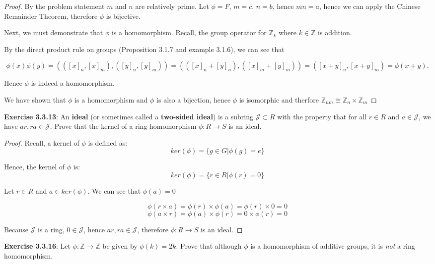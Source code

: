 \documentclass[a4paper]{article}
\begin{document}
\begin{myparindent}{0pt}
\begin{proof}
  By the problem statement $m$ and $n$ are relatively prime. Let $\phi = F$, $m = c$, $n = b$,
  hence $mn = a$, hence we can apply the Chinese Remainder Theorem, therefore $\phi$
  is bijective. \newline

  Next, we must demonstrate that $\phi$ is a homomorphism. Recall, the group
  operator for $\mathbb{Z}_k$ where $k \in \mathbb{Z}$ is addition. \newline

  By the direct product rule on groups (Proposition 3.1.7 and example 3.1.6), we
  can see that

  \[ \phi(x) \phi(y) = (([x]_n, [x]_m), ([y]_n, [y]_m)) = (([x]_n + [y]_n), ([x]_m + [y]_m)) = ([x + y]_n, [x + y]_m) = \phi(x + y). \]

  Hence $\phi$ is indeed a homomorphism. \newline

  We have shown that $\phi$ is a homomorphism and $\phi$ is also a bijection,
  hence $\phi$ is isomorphic and therfore $\mathbb{Z}_{nm} \cong \mathbb{Z}_n \times \mathbb{Z}_m$
\end{proof}

\textbf{Exercise 3.3.13}:
An \textbf{ideal} (or sometimes called a \textbf{two-sided ideal}) is a
subring $\mathcal{J} \subset R$ with the property that for all
$r \in R$ and $a \in \mathcal{J}$, we have $ar, ra \in \mathcal{J}$.
Prove that the kernel of a ring homomorphism $\phi: R \rightarrow S$ is an ideal.
\newline

\begin{proof}
  Recall, a kernel of $\phi$ is defined as:
  \[ ker(\phi) = \{ g \in G | \phi(g) = e \} \]

  Hence, the kernel of $\phi$ is:
  \[ ker(\phi) = \{ r \in R | \phi(r) = 0 \} \]

  Let $r \in R$ and $a \in ker(\phi)$. We can see that $\phi(a) = 0$

  \[ \phi(r \times a) = \phi(r) \times \phi(a) = \phi(r) \times 0 = 0 \]
  \[ \phi(a \times r) = \phi(a) \times \phi(r) = 0 \times \phi(r) = 0 \]

  Because $\mathcal{J}$ is a ring, $0 \in \mathcal{J}$, hence $ar, ra \in \mathcal{J}$,
  therefore $\phi: R \rightarrow S$ is an ideal.
\end{proof}

\textbf{Exercise 3.3.16}:
Let $\phi: \mathbb{Z} \rightarrow \mathbb{Z}$ be given by $\phi(k) = 2k$. Prove
that although $\phi$ is a homomorphism of additive groups, it is \textit{not}
a ring homomorphism.


\end{myparindent}
\end{document}
